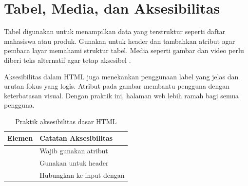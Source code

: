 \section{Tabel, Media, dan Aksesibilitas}
Tabel digunakan untuk menampilkan data yang terstruktur seperti daftar mahasiswa atau produk. Gunakan  untuk header dan tambahkan atribut agar pembaca layar memahami struktur tabel. Media seperti gambar dan video perlu diberi teks alternatif agar tetap aksesibel \cite{mdnAccessibility}.

Aksesibilitas dalam HTML juga menekankan penggunaan label yang jelas dan urutan fokus yang logis. Atribut  pada gambar membantu pengguna dengan keterbatasan visual. Dengan praktik ini, halaman web lebih ramah bagi semua pengguna.

\begin{table}[ht]
\centering
\begin{tabular}{|P{4cm}|P{7cm}|}
\hline
\textbf{Elemen} & \textbf{Catatan Aksesibilitas} \\
\hline
{} & Wajib gunakan atribut  \\
\hline
{} & Gunakan  untuk header \\
\hline
{} & Hubungkan ke input dengan  \\
\hline
\end{tabular}
\caption{Praktik aksesibilitas dasar HTML}
\end{table}

